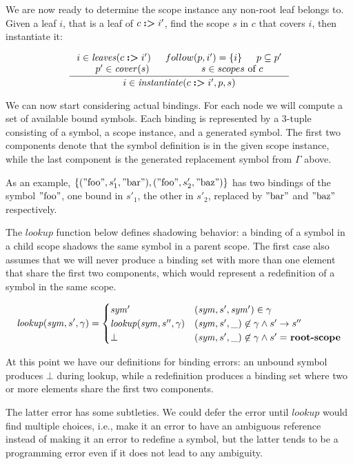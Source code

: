 \documentclass{kththesis}
\begin{document}
We are now ready to determine the scope instance any non-root leaf belongs to. Given a leaf $i$, that is a leaf of $c \mathrel{\textbf{:>}} i'$, find the scope $s$ in $c$ that covers $i$, then instantiate it:

$$
\inference{
  i \in \leaves(c \tagged i') &
  follow(p, i') = \{i\} &
  p \subseteq p' \\
  p' \in \cover(s) &
  s \in scopes \text{ of } c
}{i \in \instantiate(c \tagged i', p, s)}
$$

We can now start considering actual bindings. For each node we will compute a set of available bound symbols. Each binding is represented by a 3-tuple consisting of a symbol, a scope instance, and a generated symbol. The first two components denote that the symbol definition is in the given scope instance, while the last component is the generated replacement symbol from $\Gamma$ above.

As an example, $\{(\text{''foo''}, s'_1, \text{''bar''}), (\text{''foo''}, s'_2, \text{''baz''})\}$ has two bindings of the symbol $\text{''foo''}$, one bound in $s'_1$, the other in $s'_2$, replaced by $\text{''bar''}$ and $\text{''baz''}$ respectively.

\newcommand{\lookup}{\ensuremath{\mathit{lookup}}}

The $\lookup$ function below defines shadowing behavior: a binding of a symbol in a child scope shadows the same symbol in a parent scope. The first case also assumes that we will never produce a binding set with more than one element that share the first two components, which would represent a redefinition of a symbol in the same scope.

$$
\lookup(\mathit{sym}, s', \gamma) =
\begin{cases}
\mathit{sym}' & (\mathit{sym}, s', \mathit{sym}') \in \gamma \\
\lookup(\mathit{sym}, s'', \gamma) & (\mathit{sym}, s', \_) \not\in \gamma \land s' -> s'' \\
\bot & (\mathit{sym}, s', \_) \not\in \gamma \land s' =\ \rootscope
\end{cases}
$$

At this point we have our definitions for binding errors: an unbound symbol produces $\bot$ during lookup, while a redefinition produces a binding set where two or more elements share the first two components.

The latter error has some subtleties. We could defer the error until $\lookup$ would find multiple choices, i.e., make it an error to have an ambiguous reference instead of making it an error to redefine a symbol, but the latter tends to be a programming error even if it does not lead to any ambiguity.
\end{document}

